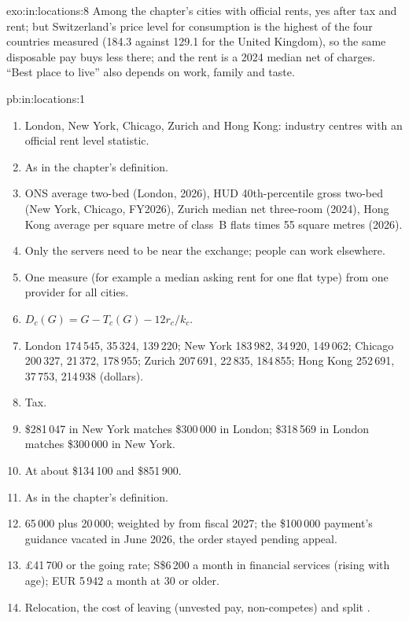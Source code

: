 \begin{solution}{exo:in:locations:8}
Among the chapter's cities with official rents, yes after tax and rent; but Switzerland's price level for consumption is
the highest of the four countries measured (184.3 against 129.1 for the United Kingdom), so the same disposable pay buys
less there; and the rent is a 2024 median net of charges. ``Best place to live'' also depends on work, family and taste.
\end{solution}

\begin{solution}{pb:in:locations:1}
\begin{enumerate}
\item London, New York, Chicago, Zurich and Hong Kong: industry centres with an official rent level statistic.
\item As in the chapter's definition.
\item ONS average two-bed (London, 2026), HUD 40th-percentile gross two-bed (New York, Chicago, FY2026), Zurich median net
three-room (2024), Hong Kong average per square metre of class~B flats times 55 square metres (2026).
\item Only the servers need to be near the exchange; people can work elsewhere.
\item One measure (for example a median asking rent for one flat type) from one provider for all cities.
\item $D_c(G)=G-T_c(G)-12r_c/k_c$.
\item London 174\,545, 35\,324, 139\,220; New York 183\,982, 34\,920, 149\,062; Chicago 200\,327, 21\,372, 178\,955;
Zurich 207\,691, 22\,835, 184\,855; Hong Kong 252\,691, 37\,753, 214\,938 (dollars).
\item Tax.
\item \$281\,047 in New York matches \$300\,000 in London; \$318\,569 in London matches \$300\,000 in New York.
\item At about \$134\,100 and \$851\,900.
\item As in the chapter's definition.
\item 65\,000 plus 20\,000; weighted by  from fiscal 2027; the \$100\,000 payment's guidance vacated in June
2026, the order stayed pending appeal.
\item \pounds 41\,700 or the going rate; S\$6\,200 a month in financial services (rising with age); EUR 5\,942 a month
at 30 or older.
\item Relocation, the cost of leaving (unvested pay, non-competes) and split .

\end{enumerate}
\end{solution}
